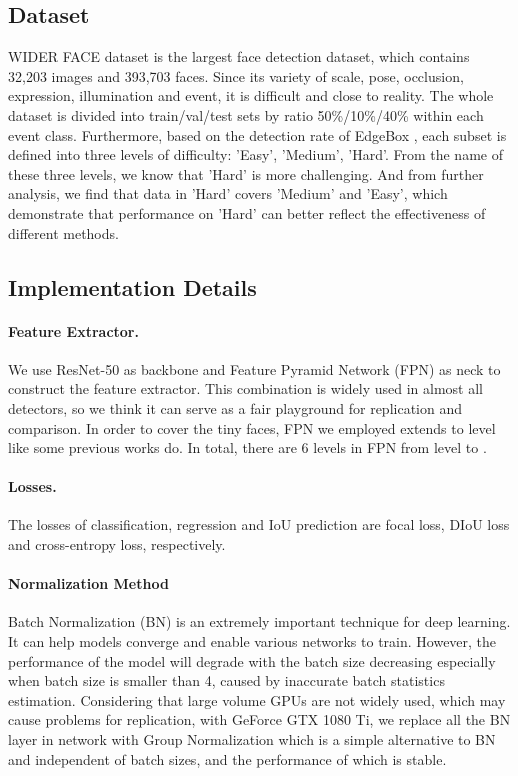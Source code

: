 \documentclass[final]{cvpr}
\begin{document}
\subsection{Dataset}
WIDER FACE dataset \cite{yang2016wider} is the largest face detection dataset, which contains 32,203 images and 393,703 faces. Since its variety of scale, pose, occlusion, expression, illumination and event, it is difficult and close to reality. The whole dataset is divided into train/val/test sets by ratio 50\%/10\%/40\% within each event class. Furthermore, based on the detection rate of EdgeBox \cite{zitnick2014edge}, each subset is defined into three levels of difficulty: ’Easy’, ’Medium’, ’Hard’. From the name of these three levels, we know that 'Hard' is more challenging. And from further analysis, we find that data in 'Hard' covers 'Medium' and 'Easy', which demonstrate that performance on 'Hard' can better reflect the effectiveness of different methods.

\subsection{Implementation Details}

\paragraph{Feature Extractor.}
We use ResNet-50 \cite{he2016deep} as backbone and Feature Pyramid Network (FPN) \cite{lin2017feature} as neck to construct the feature extractor. This combination is widely used in almost all detectors, so we think it can serve as a fair playground for replication and comparison. In order to cover the tiny faces, FPN \cite{lin2017feature} we employed extends to level  like some previous works do. In total, there are 6 levels in FPN \cite{lin2017feature} from level  to .

\paragraph{Losses.}
The losses of classification, regression and IoU prediction are focal loss, DIoU loss and cross-entropy loss, respectively. 

\paragraph{Normalization Method}
Batch Normalization (BN) \cite{ioffe2015batch} is an extremely important technique for deep learning. It can help models converge and enable various networks to train. However, the performance of the model will degrade with the batch size decreasing especially when batch size is smaller than 4, caused by inaccurate batch statistics estimation. Considering that large volume GPUs are not widely used, which may cause problems for replication, with GeForce GTX 1080 Ti, we replace all the BN layer in network with Group Normalization \cite{wu2018group} which is a simple alternative to BN and independent of batch sizes, and the performance of which is stable.
\end{document}
